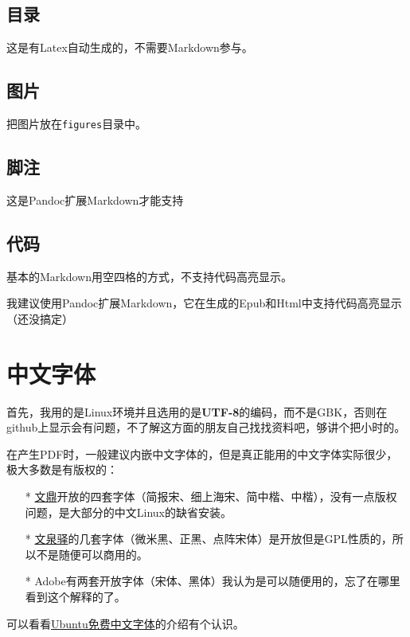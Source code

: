 \documentclass[a4paper]{book}
\begin{document}
\subsection{目录}

这是有Latex自动生成的，不需要Markdown参与。

\subsection{图片}

把图片放在{\texttt{figures}}目录中。

\subsection{脚注}

这是Pandoc扩展Markdown才能支持

\subsection{代码}

基本的Markdown用空四格的方式，不支持代码高亮显示。

我建议使用Pandoc扩展Markdown，它在生成的Epub和Html中支持代码高亮显示（还没搞定）

\section{中文字体}

首先，我用的是Linux环境并且选用的是\textbf{UTF-8}的编码，而不是GBK，否则在github上显示会有问题，不了解这方面的朋友自己找找资料吧，够讲个把小时的。

在产生PDF时，一般建议内嵌中文字体的，但是真正能用的中文字体实际很少，极大多数是有版权的：

\begin{itemize}\setlength{\itemsep}{1pt}\setlength{\parskip}{0pt}\setlength{\parsep}{0pt}
\item[*]
  \href{http://www.arphic.com.tw/}{文鼎}开放的四套字体（简报宋、细上海宋、简中楷、中楷），没有一点版权问题，是大部分的中文Linux的缺省安装。
\item[*]
  \href{http://wenq.org/}{文泉驿}的几套字体（微米黑、正黑、点阵宋体）是开放但是GPL性质的，所以不是随便可以商用的。
\item[*]
  Adobe有两套开放字体（宋体、黑体）我认为是可以随便用的，忘了在哪里看到这个解释的了。
\end{itemize}
可以看看\href{http://wiki.ubuntu.org.cn/\%E5\%85\%8D\%E8\%B4\%B9\%E4\%B8\%AD\%E6\%96\%87\%E5\%AD\%97\%E4\%BD\%93}{Ubuntu免费中文字体}的介绍有个认识。
\end{document}
